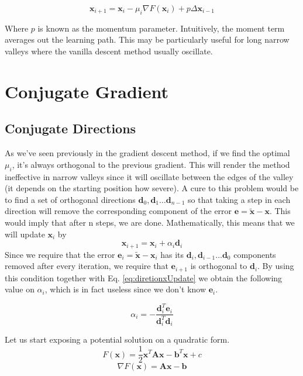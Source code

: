 \documentclass[a4paper,10pt]{article}
\theoremstyle{definition}
\begin{document}
\begin{equation}
	\pmb{x}_{i+1} = \pmb{x}_i - \mu_i \nabla F(\pmb{x}_i) + p\Delta \pmb{x}_{i-1}
\end{equation}

Where $p$ is known as the momentum parameter. Intuitively, the moment term averages out the learning path. This may be particularly useful for long narrow valleys where the vanilla descent method usually oscillate.

\section{Conjugate Gradient}

\subsection{Conjugate Directions}

As we've seen previously in the gradient descent method, if we find the optimal $\mu_i$, it's always orthogonal to the previous gradient. This will render the method ineffective in narrow valleys since it will oscillate between the edges of the valley (it depends on the starting position how severe). A cure to this problem would be to find a set of orthogonal directions $\pmb{d}_0, \pmb{d}_1 \dots \pmb{d}_{n-1}$ so that taking a step in each direction will remove the corresponding component of the error $\pmb{e} = \tilde{\pmb{x}} - \pmb{x}$. This would imply that after n steps, we are done. Mathematically, this means that we will update $\pmb{x}_i$ by
\begin{equation}
	\pmb{x}_{i+1} = \pmb{x}_i + \alpha_i\pmb{d}_i
	\label{eq:diretionxUpdate}
\end{equation}
Since we require that the error $\pmb{e}_i = \tilde{\pmb{x}} - \pmb{x}_i$ has its $\pmb{d}_i, \pmb{d}_{i-1} \dots \pmb{d}_0$ components removed after every iteration, we require that $\pmb{e}_{i+1}$ is orthogonal to $\pmb{d}_i$. By using this condition together with Eq. \ref{eq:diretionxUpdate} we obtain the following value on $\alpha_i$, which is in fact useless since we don't know $\pmb{e}_i$.

\begin{equation}
	\alpha_i  = - \frac{\pmb{d}^T_i\pmb{e}_i}{\pmb{d}^T_i\pmb{d}_i}
	\label{eq:errorUpdateAlpha}
\end{equation}

Let us start exposing a potential solution on a quadratic form.
\begin{equation}
	F(\pmb{x}) = \frac{1}{2}\pmb{x}^T\pmb{A}\pmb{x} - \pmb{b}^T\pmb{x} + c
\end{equation}
\begin{equation}
	\nabla F(\pmb{x}) = \pmb{A}\pmb{x} - \pmb{b}
\end{equation}
\end{document}

